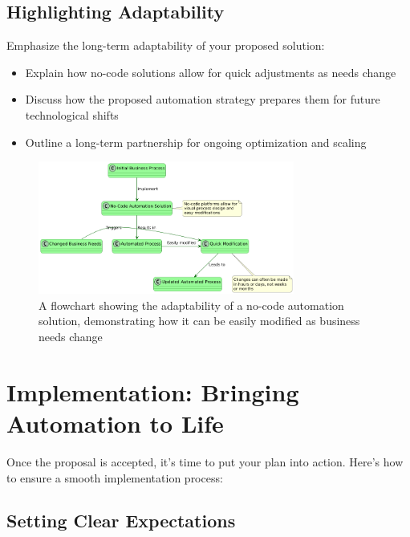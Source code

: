 \subsection{Highlighting Adaptability}

Emphasize the long-term adaptability of your proposed solution:

\begin{itemize}
    \item Explain how no-code solutions allow for quick adjustments as needs change
    \item Discuss how the proposed automation strategy prepares them for future technological shifts
    \item Outline a long-term partnership for ongoing optimization and scaling
\end{itemize}


\begin{figure}
    \centering
    \includegraphics[width=0.75\textwidth]{figures/06-adaptability-no-code-solution}
    \caption{A flowchart showing the adaptability of a no-code automation solution, demonstrating how it can be easily modified as business needs change}
    \label{fig:06-adaptability-no-code-solution}
\end{figure}

\section{Implementation: Bringing Automation to Life}

Once the proposal is accepted, it's time to put your plan into action. Here's how to ensure a smooth implementation process:

\subsection{Setting Clear Expectations}


